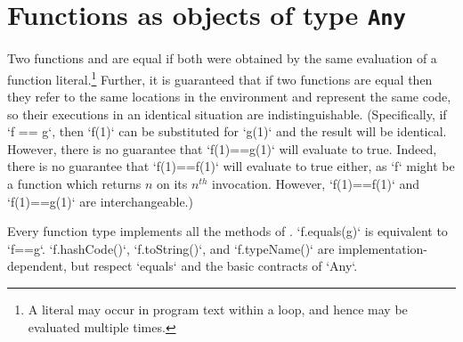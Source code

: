\section{Functions as objects of type {\tt Any}}
\label{FunctionAnyMethods}

\label{FunctionEquality}
  Two functions  and
 are equal if both were obtained by the same evaluation of a function
literal.\footnote{A literal may occur in program text within a loop, and hence
  may be evaluated multiple times.} Further, it is guaranteed that if two
functions are equal then they refer to the same locations in the environment
and represent the same code, so their executions in an identical situation are
indistinguishable. (Specifically, if \xcd`f == g`, then \xcd`f(1)` can be
substituted for \xcd`g(1)` and the result will be identical. However, there is
no guarantee that \xcd`f(1)==g(1)` will evaluate to true. Indeed, there is no
guarantee that \xcd`f(1)==f(1)` will evaluate to true either, as \xcd`f` might
be a function which returns {$n$} on its {$n^{th}$} invocation. However,
\xcd`f(1)==f(1)` and \xcd`f(1)==g(1)` are interchangeable.)


Every function type implements all the methods of .
\xcd`f.equals(g)` is equivalent to \xcd`f==g`.  \xcd`f.hashCode()`, 
\xcd`f.toString()`, and \xcd`f.typeName()` are implementation-dependent, but
respect \xcd`equals` and the basic contracts of \xcd`Any`. 

